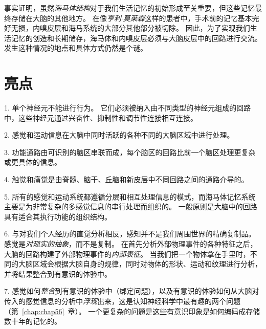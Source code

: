 事实证明，虽然\textit{海马体结构}对于我们生活记忆的初始形成至关重要，但这些记忆最终存储在大脑的其他地方。
在像\textit{亨利$\cdot$莫莱森}这样的患者中，手术前的记忆基本完好无损，内嗅皮层和海马系统的大部分其他部分被切除。
因此，为了实现我们生活记忆的创造和长期储存，海马体和内嗅皮层必须与大脑皮层中的回路进行交流。
发生这种情况的地点和具体方式仍然是个谜。



\section{亮点}

1. 单个神经元不能进行行为。
它们必须被纳入由不同类型的神经元组成的回路中，这些神经元通过兴奋性、抑制性和调节性连接相互连接。


2. 感觉和运动信息在大脑中同时活跃的各种不同的大脑区域中进行处理。


3. 功能通路由可识别的脑区串联而成，每个脑区的回路比前一个脑区处理更复杂或更具体的信息。


4. 触觉和痛觉是由脊髓、脑干、丘脑和新皮层中不同回路之间的通路介导的。


5. 所有的感觉和运动系统都遵循分层和相互处理信息的模式，而海马体记忆系统主要是为非常复杂的多感觉信息的串行处理而组织的。
一般原则是大脑中的回路具有适合其执行功能的组织结构。


6. 与对我们个人经历的直觉分析相反，感知并不是我们周围世界的精确复制品。
感觉是\textit{对现实的抽象}，而不是复制。
在首先分析外部物理事件的各种特征之后，大脑的回路构建了外部物理事件的\textit{内部表征}。
当我们把一个物体拿在手里时，不同的大脑区域会根据大脑自身的规律，同时对物体的形状、运动和纹理进行分析，并将结果整合到有意识的体验中。


7. 感觉如何\textit{整合}到有意识的体验中（绑定问题），以及有意识的体验如何从大脑对传入的感觉信息的分析中\textit{浮现}出来，这是认知神经科学中最有趣的两个问题（第~\ref{chap:chap56}~章）。
一个更复杂的问题是这些有意识印象是如何编码成存储数十年的记忆的。
























